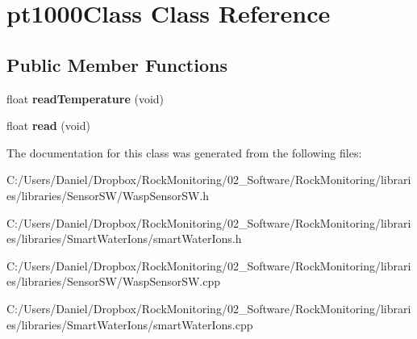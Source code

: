 \hypertarget{classpt1000_class}{}\section{pt1000\+Class Class Reference}
\label{classpt1000_class}
\subsection*{Public Member Functions}
\begin{DoxyCompactItemize}
\item 
float {\bfseries read\+Temperature} (void)\hypertarget{classpt1000_class_adbfc9b6c9d744257ed3b790e2dc07953}{}\label{classpt1000_class_adbfc9b6c9d744257ed3b790e2dc07953}

\item 
float {\bfseries read} (void)\hypertarget{classpt1000_class_aeec5a7b1962bdc24eb4824bd62f35ab4}{}\label{classpt1000_class_aeec5a7b1962bdc24eb4824bd62f35ab4}

\end{DoxyCompactItemize}


The documentation for this class was generated from the following files\+:\begin{DoxyCompactItemize}
\item 
C\+:/\+Users/\+Daniel/\+Dropbox/\+Rock\+Monitoring/02\+\_\+\+Software/\+Rock\+Monitoring/libraries/libraries/\+Sensor\+S\+W/Wasp\+Sensor\+S\+W.\+h\item 
C\+:/\+Users/\+Daniel/\+Dropbox/\+Rock\+Monitoring/02\+\_\+\+Software/\+Rock\+Monitoring/libraries/libraries/\+Smart\+Water\+Ions/smart\+Water\+Ions.\+h\item 
C\+:/\+Users/\+Daniel/\+Dropbox/\+Rock\+Monitoring/02\+\_\+\+Software/\+Rock\+Monitoring/libraries/libraries/\+Sensor\+S\+W/Wasp\+Sensor\+S\+W.\+cpp\item 
C\+:/\+Users/\+Daniel/\+Dropbox/\+Rock\+Monitoring/02\+\_\+\+Software/\+Rock\+Monitoring/libraries/libraries/\+Smart\+Water\+Ions/smart\+Water\+Ions.\+cpp\end{DoxyCompactItemize}
